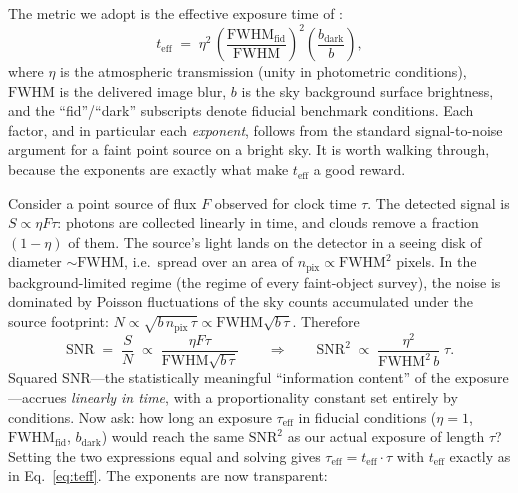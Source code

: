 \documentclass[11pt]{article}
\newcommand{\teff}{t_{\mathrm{eff}}}
\newcommand{\fwhm}{\mathrm{FWHM}}
\begin{document}
The metric we adopt is the effective exposure time of \citet{neilsen2019}:
\begin{equation}
  \teff \;=\; \eta^2 \,
  \left( \frac{\fwhm_{\mathrm{fid}}}{\fwhm} \right)^{2}
  \left( \frac{b_{\mathrm{dark}}}{b} \right),
  \label{eq:teff}
\end{equation}
where $\eta$ is the atmospheric transmission (unity in photometric conditions),
$\fwhm$ is the delivered image blur, $b$ is the sky background surface brightness,
and the ``fid''/``dark'' subscripts denote fiducial benchmark conditions.
Each factor, and in particular each \emph{exponent}, follows from the standard
signal-to-noise argument for a faint point source on a bright sky. It is worth
walking through, because the exponents are exactly what make $\teff$ a good reward.

Consider a point source of flux $F$ observed for clock time $\tau$. The detected
signal is $S \propto \eta F \tau$: photons are collected linearly in time, and clouds
remove a fraction $(1-\eta)$ of them. The source's light lands on the detector in a
seeing disk of diameter $\sim \fwhm$, i.e.\ spread over an area of
$n_{\mathrm{pix}} \propto \fwhm^2$ pixels. In the background-limited regime (the
regime of every faint-object survey), the noise is dominated by Poisson fluctuations
of the sky counts accumulated under the source footprint:
$N \propto \sqrt{b \, n_{\mathrm{pix}} \, \tau} \propto \fwhm \sqrt{b\,\tau}$.
Therefore
\begin{equation}
  \mathrm{SNR} \;=\; \frac{S}{N}
  \;\propto\; \frac{\eta F \tau}{\fwhm \sqrt{b\,\tau}}
  \qquad\Longrightarrow\qquad
  \mathrm{SNR}^2 \;\propto\; \frac{\eta^2}{\fwhm^{2}\, b}\;\tau .
  \label{eq:snr}
\end{equation}
Squared SNR---the statistically meaningful ``information content'' of the
exposure---accrues \emph{linearly in time}, with a proportionality constant set
entirely by conditions. Now ask: how long an exposure $\tau_{\mathrm{eff}}$ in
fiducial conditions ($\eta=1$, $\fwhm_{\mathrm{fid}}$, $b_{\mathrm{dark}}$) would
reach the same $\mathrm{SNR}^2$ as our actual exposure of length $\tau$? Setting the
two expressions equal and solving gives $\tau_{\mathrm{eff}} = \teff \cdot \tau$ with
$\teff$ exactly as in Eq.~\eqref{eq:teff}. The exponents are now transparent:
\end{document}
